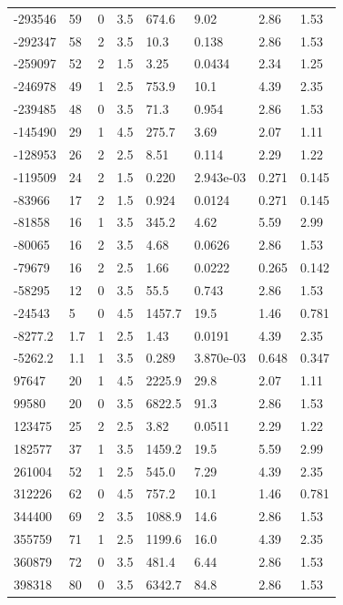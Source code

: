 \documentclass[preview]{standalone}
\begin{document}
{{\begin{tabular}{L{1.2cm}C{1.2cm} C{0.3cm}C{0.5cm} C{1.4cm}C{1.4cm} C{1.4cm}C{1.4cm}}
  -293546  &    59  & 0     & 3.5 &  674.6  & 9.02  & 2.86 &  1.53   \\ 
  -292347  &    58  & 2     & 3.5 &  10.3  & 0.138  & 2.86 &  1.53   \\ 
  -259097  &    52  & 2     & 1.5 &  3.25  & 0.0434  & 2.34 &  1.25   \\ 
  -246978  &    49  & 1     & 2.5 &  753.9  & 10.1  & 4.39 &  2.35   \\ 
  -239485  &    48  & 0     & 3.5 &  71.3  & 0.954  & 2.86 &  1.53   \\ 
  -145490  &    29  & 1     & 4.5 &  275.7  & 3.69  & 2.07 &  1.11   \\ 
  -128953  &    26  & 2     & 2.5 &  8.51  & 0.114  & 2.29 &  1.22   \\ 
  -119509  &    24  & 2     & 1.5 &  0.220  & 2.943e-03  & 0.271 &  0.145   \\ 
  -83966  &    17  & 2     & 1.5 &  0.924  & 0.0124  & 0.271 &  0.145   \\ 
  -81858  &    16  & 1     & 3.5 &  345.2  & 4.62  & 5.59 &  2.99   \\ 
  -80065  &    16  & 2     & 3.5 &  4.68  & 0.0626  & 2.86 &  1.53   \\ 
  -79679  &    16  & 2     & 2.5 &  1.66  & 0.0222  & 0.265 &  0.142   \\ 
  -58295  &    12  & 0     & 3.5 &  55.5  & 0.743  & 2.86 &  1.53   \\ 
  -24543  &     5  & 0     & 4.5 &  1457.7  & 19.5  & 1.46 &  0.781   \\ 
  -8277.2  &   1.7  & 1     & 2.5 &  1.43  & 0.0191  & 4.39 &  2.35   \\ 
  -5262.2  &   1.1  & 1     & 3.5 &  0.289  & 3.870e-03  & 0.648 &  0.347   \\ 
  97647  &    20  & 1     & 4.5 &  2225.9  & 29.8  & 2.07 &  1.11   \\ 
  99580  &    20  & 0     & 3.5 &  6822.5  & 91.3  & 2.86 &  1.53   \\ 
  123475  &    25  & 2     & 2.5 &  3.82  & 0.0511  & 2.29 &  1.22   \\ 
  182577  &    37  & 1     & 3.5 &  1459.2  & 19.5  & 5.59 &  2.99   \\ 
  261004  &    52  & 1     & 2.5 &  545.0  & 7.29  & 4.39 &  2.35   \\ 
  312226  &    62  & 0     & 4.5 &  757.2  & 10.1  & 1.46 &  0.781   \\ 
  344400  &    69  & 2     & 3.5 &  1088.9  & 14.6  & 2.86 &  1.53   \\ 
  355759  &    71  & 1     & 2.5 &  1199.6  & 16.0  & 4.39 &  2.35   \\ 
  360879  &    72  & 0     & 3.5 &  481.4  & 6.44  & 2.86 &  1.53   \\ 
  398318  &    80  & 0     & 3.5 &  6342.7  & 84.8  & 2.86 &  1.53   \\ 
\hline 
\end{tabular} 

}}
\end{document}
